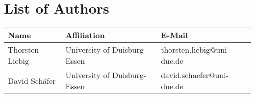 \chapter*{List of Authors}

\begin{tabularx}{\textwidth}{llX}
  \textbf{Name}&\textbf{Affiliation}&\textbf{E-Mail} \\ \hline
  Thorsten Liebig&University of Duisburg-Essen&thorsten.liebig@uni-due.de \\ 
  David Schäfer&University of Duisburg-Essen&david.schaefer@uni-due.de
\end{tabularx}
